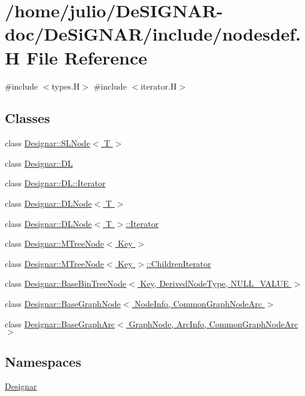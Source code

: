 \hypertarget{nodesdef_8_h}{}\section{/home/julio/\+De\+S\+I\+G\+N\+A\+R-\/doc/\+De\+Si\+G\+N\+A\+R/include/nodesdef.H File Reference}
\label{nodesdef_8_h}
{\ttfamily \#include $<$types.\+H$>$}\newline
{\ttfamily \#include $<$iterator.\+H$>$}\newline
\subsection*{Classes}
\begin{DoxyCompactItemize}
\item 
class \hyperlink{class_designar_1_1_s_l_node}{Designar\+::\+S\+L\+Node$<$ T $>$}
\item 
class \hyperlink{class_designar_1_1_d_l}{Designar\+::\+DL}
\item 
class \hyperlink{class_designar_1_1_d_l_1_1_iterator}{Designar\+::\+D\+L\+::\+Iterator}
\item 
class \hyperlink{class_designar_1_1_d_l_node}{Designar\+::\+D\+L\+Node$<$ T $>$}
\item 
class \hyperlink{class_designar_1_1_d_l_node_1_1_iterator}{Designar\+::\+D\+L\+Node$<$ T $>$\+::\+Iterator}
\item 
class \hyperlink{class_designar_1_1_m_tree_node}{Designar\+::\+M\+Tree\+Node$<$ Key $>$}
\item 
class \hyperlink{class_designar_1_1_m_tree_node_1_1_children_iterator}{Designar\+::\+M\+Tree\+Node$<$ Key $>$\+::\+Children\+Iterator}
\item 
class \hyperlink{class_designar_1_1_base_bin_tree_node}{Designar\+::\+Base\+Bin\+Tree\+Node$<$ Key, Derived\+Node\+Type, N\+U\+L\+L\+\_\+\+V\+A\+L\+U\+E $>$}
\item 
class \hyperlink{class_designar_1_1_base_graph_node}{Designar\+::\+Base\+Graph\+Node$<$ Node\+Info, Common\+Graph\+Node\+Arc $>$}
\item 
class \hyperlink{class_designar_1_1_base_graph_arc}{Designar\+::\+Base\+Graph\+Arc$<$ Graph\+Node, Arc\+Info, Common\+Graph\+Node\+Arc $>$}
\end{DoxyCompactItemize}
\subsection*{Namespaces}
\begin{DoxyCompactItemize}
\item 
 \hyperlink{namespace_designar}{Designar}
\end{DoxyCompactItemize}
